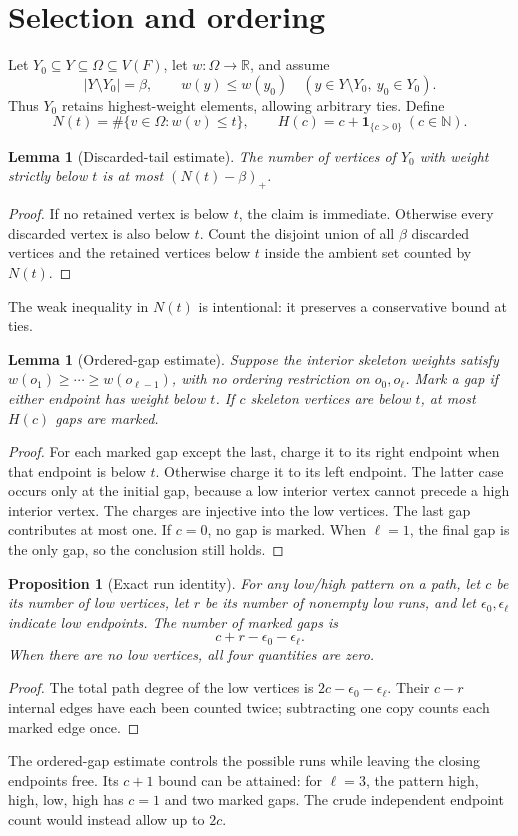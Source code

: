 \documentclass[11pt,letterpaper]{article}
\newtheorem{lemma}[theorem]{Lemma}
\newtheorem{proposition}[theorem]{Proposition}
\theoremstyle{remark}\newtheorem{remark}[theorem]{Remark}
\newcommand{\NN}{\mathbb N}
\newcommand{\ind}{\mathbf 1}
\begin{document}
\section{Selection and ordering}
Let $Y_0\subseteq Y\subseteq\Omega\subseteq V(F)$, let $w:\Omega\to\mathbb R$, and assume
\[
 |Y\setminus Y_0|=\beta,\qquad
 w(y)\le w(y_0)\quad(y\in Y\setminus Y_0,\ y_0\in Y_0).
\]
Thus $Y_0$ retains highest-weight elements, allowing arbitrary ties. Define
\[
 N(t)=\#\{v\in\Omega:w(v)\le t\},\qquad H(c)=c+\ind_{\{c>0\}}\ (c\in\NN).
\]
\begin{lemma}[Discarded-tail estimate]\label{lem:tail}
The number of vertices of $Y_0$ with weight strictly below $t$ is at most $(N(t)-\beta)_+$.
\end{lemma}
\begin{proof}
If no retained vertex is below $t$, the claim is immediate. Otherwise every discarded vertex is also below $t$. Count the disjoint union of all $\beta$ discarded vertices and the retained vertices below $t$ inside the ambient set counted by $N(t)$.
\end{proof}
The weak inequality in $N(t)$ is intentional: it preserves a conservative bound at ties.

\begin{lemma}[Ordered-gap estimate]\label{lem:gaps}
Suppose the interior skeleton weights satisfy
$w(o_1)\ge\cdots\ge w(o_{\ell-1})$, with no ordering restriction on $o_0,o_\ell$. Mark a gap if either endpoint has weight below $t$. If $c$ skeleton vertices are below $t$, at most $H(c)$ gaps are marked.
\end{lemma}
\begin{proof}
For each marked gap except the last, charge it to its right endpoint when that endpoint is below $t$. Otherwise charge it to its left endpoint. The latter case occurs only at the initial gap, because a low interior vertex cannot precede a high interior vertex. The charges are injective into the low vertices. The last gap contributes at most one. If $c=0$, no gap is marked. When $\ell=1$, the final gap is the only gap, so the conclusion still holds.
\end{proof}

\begin{proposition}[Exact run identity]\label{prop:runs}
For any low/high pattern on a path, let $c$ be its number of low vertices, let $r$ be its number of nonempty low runs, and let $\epsilon_0,\epsilon_\ell$ indicate low endpoints. The number of marked gaps is
\[
 c+r-\epsilon_0-\epsilon_\ell.
\]
When there are no low vertices, all four quantities are zero.
\end{proposition}
\begin{proof}
The total path degree of the low vertices is $2c-\epsilon_0-\epsilon_\ell$. Their $c-r$ internal edges have each been counted twice; subtracting one copy counts each marked edge once.
\end{proof}
The ordered-gap estimate controls the possible runs while leaving the closing endpoints free. Its $c+1$ bound can be attained: for $\ell=3$, the pattern high, high, low, high has $c=1$ and two marked gaps. The crude independent endpoint count would instead allow up to $2c$.
\end{document}

